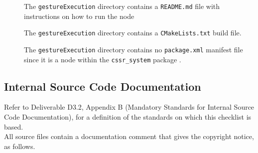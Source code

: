 \documentclass{CSSRforAfrica}
\newcommand{\checkboxChecked}{\fbox{\ding{51}}} %
\begin{document}
\begin{description}
\item[\checkboxChecked] The {\small \verb+gestureExecution+} directory contains  a {\small \verb+README.md+} file with  instructions on how to run the node 
\item[\checkboxChecked] The {\small \verb+gestureExecution+} directory contains  a {\small \verb+CMakeLists.txt+} build file.
\item[\checkboxChecked] The {\small \verb+gestureExecution+} directory contains  no {\small \verb+package.xml+} manifest file since it is a node within the {\small \verb+cssr_system+} package .

\end{description}


 
 
\subsection{Internal Source Code Documentation}
\label{subsection:gesture_execution_documentation_standards}  
 
Refer to Deliverable D3.2, Appendix B (Mandatory Standards for Internal Source Code Documentation), for a definition of the standards on which this checklist is based.\\

\noindent All source files contain a documentation comment that gives the copyright notice, as follows.
 
\end{document}
